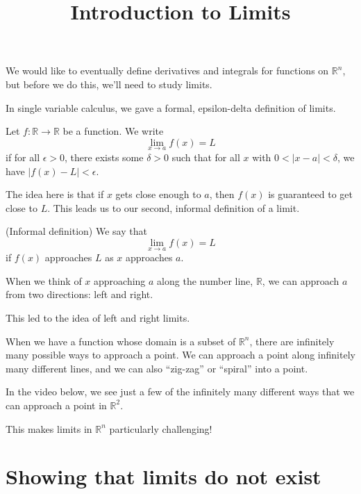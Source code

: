 \documentclass{ximera}
\title{Introduction to Limits}
\begin{document}
\begin{abstract}
\end{abstract}
\maketitle

We would like to eventually define derivatives and integrals for functions on $\mathbb{R}^n$, but before we do this, we'll need to study limits.

In single variable calculus, we gave a formal, epsilon-delta definition of limits.

\begin{definition}
Let $f:\mathbb{R}\rightarrow\mathbb{R}$ be a function. We write
\[
\lim_{x\rightarrow a} f(x) = L
\]
if for all $\epsilon >0$, there exists some $\delta >0$ such that for all $x$ with $0 < |x-a| < \delta$, we have $|f(x)-L| < \epsilon$.
\end{definition}

The idea here is that if $x$ gets close enough to $a$, then $f(x)$ is guaranteed to get close to $L$. This leads us to our second, informal definition of a limit.

\begin{definition}
(Informal definition) We say that
\[
\lim_{x\rightarrow a} f(x) = L
\]
if $f(x)$ approaches $L$ as $x$ approaches $a$.
\end{definition}

When we think of $x$ approaching $a$ along the number line, $\mathbb{R}$, we can approach $a$ from two directions: left and right.


This led to the idea of left and right limits.

When we have a function whose domain is a subset of $\mathbb{R}^n$, there are infinitely many possible ways to approach a point. We can approach a point along infinitely many different lines, and we can also ``zig-zag'' or ``spiral'' into a point.

In the video below, we see just a few of the infinitely many different ways that we can approach a point in $\mathbb{R}^2$.


This makes limits in $\mathbb{R}^n$ particularly challenging!

\section*{Showing that limits do not exist}
\end{document}
